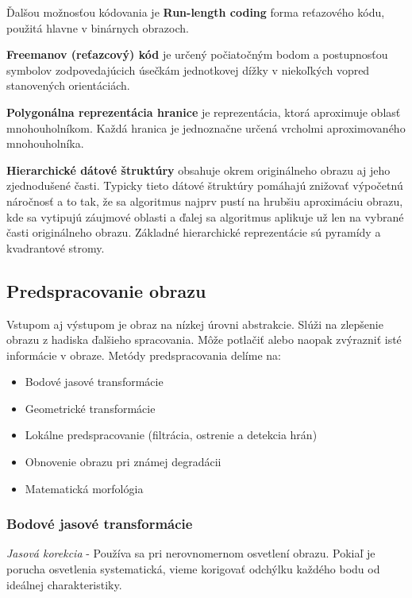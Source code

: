 \begin{itemize}
Ďalšou možnosťou kódovania je \textbf{Run-length coding} forma reťazového kódu, použitá hlavne v binárnych obrazoch. 

\textbf{Freemanov (reťazcový) kód}  je určený počiatočným bodom a postupnosťou symbolov zodpovedajúcich úsečkám jednotkovej dížky v niekoľkých vopred stanovených orientáciách. 

\textbf{Polygonálna reprezentácia hranice} je reprezentácia, ktorá aproximuje oblasť mnohouholníkom. Každá hranica je jednoznačne určená vrcholmi aproximovaného mnohouholníka.

\textbf{Hierarchické dátové štruktúry} obsahuje okrem originálneho obrazu aj jeho zjednodušené časti. Typicky tieto dátové štruktúry pomáhajú znižovať výpočetnú náročnosť a to tak, že sa algoritmus najprv pustí na hrubšiu aproximáciu obrazu, kde sa vytipujú záujmové oblasti a ďalej sa algoritmus aplikuje už len na vybrané časti originálneho obrazu. Základné hierarchické reprezentácie sú pyramídy a kvadrantové stromy. 

\end{itemize}



\subsection{Predspracovanie obrazu}
Vstupom aj výstupom je obraz na nízkej úrovni abstrakcie. Slúži na zlepšenie obrazu z hadiska ďalšieho spracovania. Môže potlačiť alebo naopak zvýrazniť isté informácie v obraze. Metódy predspracovania delíme na: 
\begin{itemize}
\item Bodové jasové transformácie
\item Geometrické transformácie
\item Lokálne predspracovanie (filtrácia, ostrenie a detekcia hrán)
\item Obnovenie obrazu pri známej degradácii 
\item Matematická morfológia 
\end{itemize}

\subsubsection{Bodové jasové transformácie}

\textit{Jasová korekcia} - Používa sa pri nerovnomernom osvetlení obrazu. Pokiaľ je porucha
osvetlenia systematická, vieme korigovať odchýlku každého bodu od ideálnej charakteristiky.


